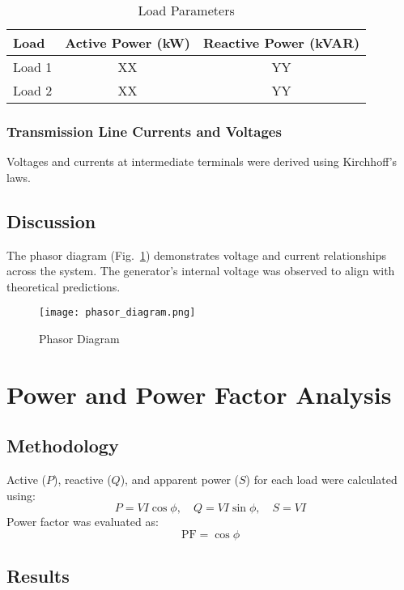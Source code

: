 \documentclass[conference]{IEEEtran}
\begin{document}
\begin{table}[H]
\caption{Load Parameters}
\centering
\begin{tabular}{@{}lcc@{}}
\toprule
Load & Active Power (kW) & Reactive Power (kVAR) \\ \midrule
Load 1 & XX & YY \\
Load 2 & XX & YY \\ \bottomrule
\end{tabular}
\label{tab:loadparams}
\end{table}

\subsubsection{Transmission Line Currents and Voltages}
Voltages and currents at intermediate terminals were derived using Kirchhoff's laws.

\subsection{Discussion}
The phasor diagram (Fig.~\ref{fig:phasor}) demonstrates voltage and current relationships across the system. The generator's internal voltage was observed to align with theoretical predictions.

\begin{figure}[H]
\centering
\texttt{[image: phasor\_diagram.png]}
\caption{Phasor Diagram}
\label{fig:phasor}
\end{figure}

\section{Power and Power Factor Analysis}

\subsection{Methodology}
Active ($P$), reactive ($Q$), and apparent power ($S$) for each load were calculated using:
\begin{equation}
P = VI \cos \phi, \quad Q = VI \sin \phi, \quad S = VI
\end{equation}
Power factor was evaluated as:
\begin{equation}
\text{PF} = \cos \phi
\end{equation}

\subsection{Results}
\end{document}
